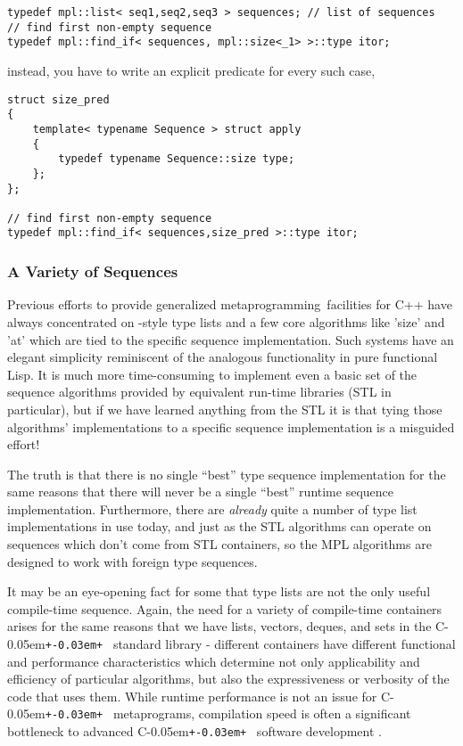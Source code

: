 \documentclass{kapproc}
\newcommand{\Cpp}{C\kern-0.05em\texttt{+\kern-0.03em+}%
}
\newcommand{\mping}{meta\-pro\-gram\-ming}
\begin{document}
\begin{enumerate}
{\small
\begin{codesamp}\begin{verbatim}
typedef mpl::list< seq1,seq2,seq3 > sequences; // list of sequences
// find first non-empty sequence
typedef mpl::find_if< sequences, mpl::size<_1> >::type itor;
\end{verbatim}
\end{codesamp}
}

instead, you have to write an explicit predicate for every such case, 

{\small
\begin{codesamp}\begin{verbatim}
struct size_pred
{
    template< typename Sequence > struct apply
    {
        typedef typename Sequence::size type;
    };
};

// find first non-empty sequence
typedef mpl::find_if< sequences,size_pred >::type itor;
\end{verbatim}
\end{codesamp}
}

\end{enumerate}

 
  \subsubsection{A Variety of Sequences}

Previous efforts to provide generalized \mping\ facilities for C++
have always concentrated on -style type lists and a few
core algorithms like 'size' and 'at' which are tied to the specific
sequence implementation. Such systems have an elegant simplicity
reminiscent of the analogous functionality in pure functional Lisp. It
is much more time-consuming to implement even a basic set of the
sequence algorithms provided by equivalent run-time libraries (STL in
particular), but if we have learned anything from the STL it is that
tying those algorithms' implementations to a specific sequence
implementation is a misguided effort!

The truth is that there is no single ``best'' type sequence
implementation for the same reasons that there will never be a single
``best'' runtime sequence implementation. Furthermore, there are
\emph{already} quite a number of type list implementations in use
today, and just as the STL algorithms can operate on sequences which
don't come from STL containers, so the MPL algorithms are designed to
work with foreign type sequences.

It may be an eye-opening fact for some that type lists are not the
only useful compile-time sequence. Again, the need for a variety of
compile-time containers arises for the same reasons that we have
lists, vectors, deques, and sets in the \Cpp\ standard library -
different containers have different functional and performance
characteristics which determine not only applicability and efficiency
of particular algorithms, but also the expressiveness or verbosity of
the code that uses them. While runtime performance is not an issue for
\Cpp\ metaprograms, compilation speed is often a significant
bottleneck to advanced \Cpp\ software development \cite{Abr01}.
\end{document}
